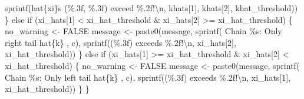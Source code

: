 \documentclass[
  letterpaper,
  DIV=11,
  numbers=noendperiod]{scrartcl}
\newenvironment{Shaded}{\begin{snugshade}}{\end{snugshade}}
\newcommand{\ConstantTok}[1]{\textcolor[rgb]{0.56,0.35,0.01}{#1}}
\newcommand{\ControlFlowTok}[1]{\textcolor[rgb]{0.00,0.23,0.31}{#1}}
\newcommand{\DecValTok}[1]{\textcolor[rgb]{0.68,0.00,0.00}{#1}}
\newcommand{\FunctionTok}[1]{\textcolor[rgb]{0.28,0.35,0.67}{#1}}
\newcommand{\NormalTok}[1]{\textcolor[rgb]{0.00,0.23,0.31}{#1}}
\newcommand{\OtherTok}[1]{\textcolor[rgb]{0.00,0.23,0.31}{#1}}
\newcommand{\SpecialCharTok}[1]{\textcolor[rgb]{0.37,0.37,0.37}{#1}}
\newcommand{\StringTok}[1]{\textcolor[rgb]{0.13,0.47,0.30}{#1}}
\begin{document}
\begin{Shaded}
\begin{Highlighting}[]
              \FunctionTok{sprintf}\NormalTok{(}\StringTok{\textquotesingle{}hat\{xi\}s (\%.3f, \%.3f) exceed \%.2f!}\SpecialCharTok{\textbackslash{}n}\StringTok{\textquotesingle{}}\NormalTok{, }
\NormalTok{                      khats[}\DecValTok{1}\NormalTok{], khats[}\DecValTok{2}\NormalTok{], khat\_threshold))}
\NormalTok{    \} }\ControlFlowTok{else} \ControlFlowTok{if}\NormalTok{ (xi\_hats[}\DecValTok{1}\NormalTok{] }\SpecialCharTok{\textless{}}\NormalTok{ xi\_hat\_threshold }\SpecialCharTok{\&} 
\NormalTok{               xi\_hats[}\DecValTok{2}\NormalTok{] }\SpecialCharTok{\textgreater{}=}\NormalTok{ xi\_hat\_threshold) \{}
\NormalTok{      no\_warning }\OtherTok{\textless{}{-}} \ConstantTok{FALSE}
\NormalTok{      message }\OtherTok{\textless{}{-}}
        \FunctionTok{paste0}\NormalTok{(message,}
               \FunctionTok{sprintf}\NormalTok{(}\StringTok{\textquotesingle{}  Chain \%s: Only right tail hat\{k\} \textquotesingle{}}\NormalTok{, c),}
               \FunctionTok{sprintf}\NormalTok{(}\StringTok{\textquotesingle{}(\%.3f) exceeds \%.2f!}\SpecialCharTok{\textbackslash{}n}\StringTok{\textquotesingle{}}\NormalTok{,}
\NormalTok{                       xi\_hats[}\DecValTok{2}\NormalTok{], xi\_hat\_threshold))}
\NormalTok{    \} }\ControlFlowTok{else} \ControlFlowTok{if}\NormalTok{ (xi\_hats[}\DecValTok{1}\NormalTok{] }\SpecialCharTok{\textgreater{}=}\NormalTok{ xi\_hat\_threshold }\SpecialCharTok{\&} 
\NormalTok{               xi\_hats[}\DecValTok{2}\NormalTok{] }\SpecialCharTok{\textless{}}\NormalTok{ xi\_hat\_threshold) \{}
\NormalTok{      no\_warning }\OtherTok{\textless{}{-}} \ConstantTok{FALSE}
\NormalTok{      message }\OtherTok{\textless{}{-}}
        \FunctionTok{paste0}\NormalTok{(message,}
               \FunctionTok{sprintf}\NormalTok{(}\StringTok{\textquotesingle{}  Chain \%s: Only left tail hat\{k\} \textquotesingle{}}\NormalTok{, c),}
               \FunctionTok{sprintf}\NormalTok{(}\StringTok{\textquotesingle{}(\%.3f) exceeds \%.2f!}\SpecialCharTok{\textbackslash{}n}\StringTok{\textquotesingle{}}\NormalTok{,}
\NormalTok{                       xi\_hats[}\DecValTok{1}\NormalTok{], xi\_hat\_threshold))}
\NormalTok{    \}}
\NormalTok{  \}}
  

\end{Highlighting}
\end{Shaded}
\end{document}
